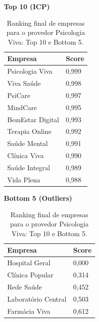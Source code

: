 \begin{table}[p]
    \centering
    \caption{Ranking final de empresas para o provedor Psicologia Viva: Top 10 e Bottom 5.}
    \label{tab:7_6_ranking_psicologiaviva}
    \begin{minipage}{0.48\textwidth}
    \centering
    \textbf{Top 10 (ICP)}\\
    \begin{tabular}{p{5cm}p{1.8cm}}
    \toprule
    Empresa & Score \\
    \midrule
    Psicologia Viva & 0,999 \\
    Viva Saúde & 0,998 \\
    PsiCare & 0,997 \\
    MindCare & 0,995 \\
    BemEstar Digital & 0,993 \\
    Terapia Online & 0,992 \\
    Saúde Mental & 0,991 \\
    Clínica Viva & 0,990 \\
    Saúde Integral & 0,989 \\
    Vida Plena & 0,988 \\
    \bottomrule
    \end{tabular}
    \end{minipage}\hfill
    \begin{minipage}{0.48\textwidth}
    \centering
    \textbf{Bottom 5 (Outliers)}\\
    \begin{tabular}{p{5cm}p{1.8cm}}
    \toprule
    Empresa & Score \\
    \midrule
    Hospital Geral & 0,000 \\
    Clínica Popular & 0,314 \\
    Rede Saúde & 0,452 \\
    Laboratório Central & 0,503 \\
    Farmácia Viva & 0,612 \\
    \bottomrule
    \end{tabular}
    \end{minipage}
\end{table}

